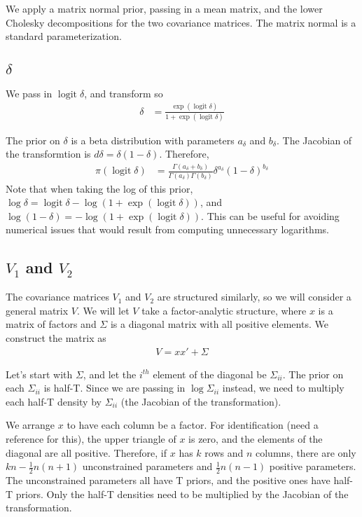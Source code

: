 \documentclass[letter,11pt]{article}
\DeclareMathOperator\logit{logit}
\begin{document}
We apply a matrix normal prior, passing in a mean matrix, and the
lower Cholesky decompositions for the two covariance matrices.  The
matrix normal is a standard parameterization.  

\subsection{$\delta$}
We pass in $\logit\delta$, and transform so
\begin{align}
  \label{eq:4}
  \delta&=\frac{\exp(\logit\delta)}{1+\exp(\logit\delta)}
\end{align}

The prior on $\delta$ is a beta distribution with parameters
$a_{\delta}$ and $b_{\delta}$.  The Jacobian of the
transformtion is $d\delta=\delta(1-\delta)$.  Therefore,
\begin{align}
  \label{eq:1}
  \pi(\logit\delta)&=\frac{\Gamma(a_{\delta}+b_{\delta})}{\Gamma(a_{\delta})\Gamma(b_{\delta})}\delta^{a_{\delta}}(1-\delta)^{b_{\delta}}
\end{align}
Note that when taking the log of this prior,
$\log\delta=\logit\delta-\log(1+\exp(\logit\delta))$, and
$\log(1-\delta)=-\log(1+\exp(\logit\delta))$.  This can be useful for
avoiding numerical issues that would result from computing unnecessary logarithms.

\subsection{$V_1$ and $V_2$}
The covariance matrices $V_1$ and $V_2$ are structured similarly, so
we will consider a general matrix $V$.  We will let $V$ take a
factor-analytic structure, where $x$ is a matrix of factors and
$\Sigma$ is a diagonal matrix with all positive elements. We construct
the matrix as
\begin{align}
  \label{eq:5}
  V=xx'+\Sigma
\end{align}

Let's start with $\Sigma$, and let the $i^{th}$ element of the
diagonal be $\Sigma_{ii}$.  The prior on each $\Sigma_{ii}$ is
half-T.  Since we are passing in $\log\Sigma_{ii}$ instead, we need to
multiply each half-T density by $\Sigma_{ii}$ (the Jacobian of the
transformation).

We arrange $x$ to have each column be a factor.  For identification
(need a reference for this), the upper triangle of $x$ is zero, and
the elements of the diagonal are all positive.  Therefore, if $x$ has
$k$ rows and $n$ columns, there are only $kn-\frac{1}{2}n(n+1)$
unconstrained parameters and $\frac{1}{2}n(n-1)$ positive parameters.
The unconstrained parameters all have T priors, and the
positive ones have half-T priors.  Only the half-T densities need to
be multiplied by the Jacobian of the transformation.
\end{document}
